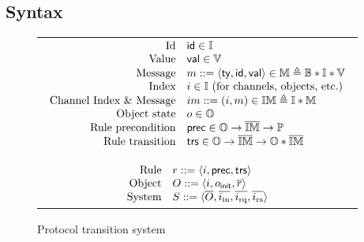 \documentclass[sigplan,10pt,review,anonymous,screen]{acmart}\settopmatter{printfolios=true,printccs=false,printacmref=false}
\begin{document}
\subsection{Syntax}
\label{sec-syntax}

\begin{figure}[t]
  \centering\small
  \setlength{\tabcolsep}{0pt}
  \def\arraystretch{1.1}
  \begin{tabular}{|c|}
    \hline
    \begin{math}
      \begin{array}{rl}
        \textrm{Id} & \textsf{id}{} \in \mathbb{I}{} \\
        \textrm{Value} & \textsf{val}{} \in \mathbb{V}{} \\
        \textrm{Message} & m ::= \langle \textsf{ty}, \textsf{id}, \textsf{val} \rangle \in \mathbb{M}{} \triangleq \mathbb{B} \ast \mathbb{I} \ast \mathbb{V} \\
        \textrm{Index} & i \in \mathbb{I}{}\ \textrm{(for channels, objects, etc.)} \\
        \textrm{Channel Index \& Message} & im ::= (i, m) \in \mathbb{IM} \triangleq \mathbb{I} \ast \mathbb{M} \\
        \textrm{Object state} & o \in \mathbb{O}{} \\
        \textrm{Rule precondition} & \textsf{prec}{} \in \mathbb{O} \to \overline{\mathbb{IM}} \to \mathbb{P} \\
        \textrm{Rule transition} & \textsf{trs}{} \in \mathbb{O} \to \overline{\mathbb{IM}} \to \mathbb{O} \ast \overline{\mathbb{IM}}\\
      \end{array}
    \end{math}\\
    \mbox{}\vspace{-10pt} \\ %
    \hline
    \mbox{}\vspace{-10pt} \\ %
    \begin{math}
      \begin{array}{rl}
        \textrm{Rule} & r ::= \langle i, \textsf{prec}{}, \textsf{trs}{} \rangle \\
        \textrm{Object} & O ::= \langle i, o_{\textsf{init}}, \overline{r} \rangle \\
        \textrm{System} & S ::= \langle \overline{O}, \overline{i_{\textrm{in}}}, \overline{i_{\textrm{rq}}}, \overline{i_{\textrm{rs}}} \rangle \\
      \end{array}
    \end{math}\\
    \hline
  \end{tabular}
  \caption{Protocol transition system}
  \label{fig-trs-system}
\end{figure}
\end{document}
